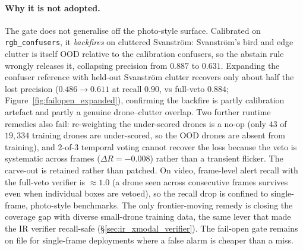 \paragraph{Why it is not adopted.}
The gate does not generalise off the photo-style surface. Calibrated on \texttt{rgb\_confusers}, it \emph{backfires} on cluttered Svanstr\"om: Svanstr\"om's bird and edge clutter is itself OOD relative to the calibration confusers, so the abstain rule wrongly releases it, collapsing precision from $0.887$ to $0.631$.
Expanding the confuser reference with held-out Svanstr\"om clutter recovers only about half the lost precision ($0.486 \to 0.611$ at recall $0.90$, vs full-veto $0.884$; Figure~\ref{fig:failopen_expanded}), confirming the backfire is partly calibration artefact and partly a genuine drone--clutter overlap.
Two further runtime remedies also fail: re-weighting the under-scored drones is a no-op (only $43$ of $19{,}334$ training drones are under-scored, so the OOD drones are absent from training), and $2$-of-$3$ temporal voting cannot recover the loss because the veto is systematic across frames ($\Delta R = -0.008$) rather than a transient flicker.
The carve-out is retained rather than patched. On video, frame-level alert recall with the full-veto verifier is ${\approx}1.0$ (a drone seen across consecutive frames survives even when individual boxes are vetoed), so the recall drop is confined to single-frame, photo-style benchmarks. The only frontier-moving remedy is closing the coverage gap with diverse small-drone training data, the same lever that made the IR verifier recall-safe (\S\ref{sec:ir_xmodal_verifier}). The fail-open gate remains on file for single-frame deployments where a false alarm is cheaper than a miss.

